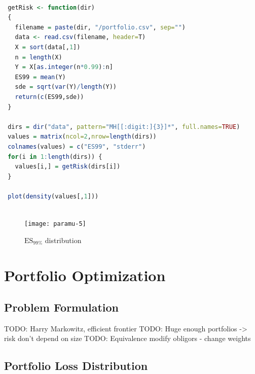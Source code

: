 \documentclass[11pt,fleqn]{book} %
\begin{document}
\begin{lstlisting}[language=R, label={sc:paramu5}, caption={$ES_{99\%}$ distribution (R script)}]

 getRisk <- function(dir)
 {
   filename = paste(dir, "/portfolio.csv", sep="")
   data <- read.csv(filename, header=T)
   X = sort(data[,1])
   n = length(X)
   Y = X[as.integer(n*0.99):n]
   ES99 = mean(Y)
   sde = sqrt(var(Y)/length(Y))
   return(c(ES99,sde))
 }

 dirs = dir("data", pattern="MH[[:digit:]{3}]*", full.names=TRUE)
 values = matrix(ncol=2,nrow=length(dirs))
 colnames(values) = c("ES99", "stderr")
 for(i in 1:length(dirs)) {
   values[i,] = getRisk(dirs[i])
 }
 
 plot(density(values[,1]))
 
\end{lstlisting}

\begin{figure}[!ht]
	\centering
	\texttt{[image: paramu-5]}
	\caption{$\text{ES}_{99\%}$ distribution}
	\label{fig:paramu5}
\end{figure}


\chapter{Portfolio Optimization}

\section{Problem Formulation}

TODO: Harry Markowitz, efficient frontier
TODO: Huge enough portfolios -> risk don't depend on size
TODO: Equivalence modify obligors - change weights

\section{Portfolio Loss Distribution}
\end{document}
